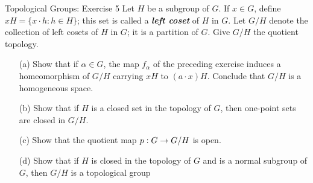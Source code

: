 \documentclass{hmwk}
\begin{document}
\begin{problem}{Topological Groups: Exercise 5}
    Let $H$ be a subgroup of $G$. If $x \in G$, define $xH = \{x \cdot h : h \in H\}$; this set is called a \textbf{\textit{left coset}} of $H$ in $G$. Let $G/H$ denote the collection of left cosets of $H$ in $G$; it is a partition of $G$. Give $G/H$ the quotient topology. 
    \begin{itemize}
        \item[(a)] Show that if $\alpha \in G$, the map $f_\alpha$ of the preceding exercise induces a homeomorphism of $G/H$ carrying $xH$ to $(a \cdot x)H$. Conclude that $G/H$ is a homogeneous space.
        \item[(b)] Show that if $H$ is a closed set in the topology of $G$, then one-point sets are closed in $G/H$. 
        \item[(c)] Show that the quotient map $p: G \rightarrow G/H$ is open. 
        \item[(d)] Show that if $H$ is closed in the topology of $G$ and is a normal subgroup of $G$, then $G/H$ is a topological group
    \end{itemize}
\end{problem}
\end{document}
